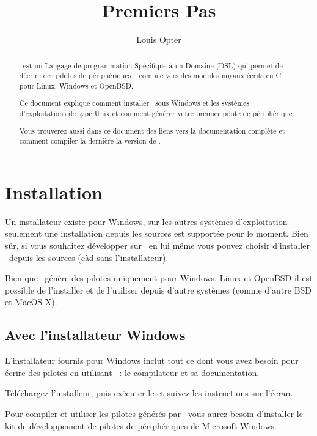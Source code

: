 \documentclass[francais]{rtxarticle}
\title{Premiers Pas}
\author{Louis Opter}
\begin{document}
\maketitle

\begin{abstract}
\rtx\ est un Langage de programmation Spécifique à un Domaine (DSL) qui permet
de décrire des pilotes de périphériques. \rtx\ compile vers des modules noyaux
écrits en C pour Linux, Windows et OpenBSD.

Ce document explique comment installer \rtx\ sous Windows et les systèmes
d'exploitations de type Unix et comment générer votre premier pilote de
périphérique.

Vous trouverez aussi dans ce document des liens vers la documentation complète
et comment compiler la dernière la version de \rtx.
\end{abstract}

\tableofcontents

\section{Installation}

Un installateur existe pour Windows, sur les autres systèmes d'exploitation
seulement une installation depuis les sources est supportée pour le moment.
Bien sûr, si vous souhaitez développer sur \rtx\ en lui même vous pouvez
choisir d'installer \rtx\ depuis les sources (càd sans l'installateur).

Bien que \rtx\ génère des pilotes uniquement pour Windows, Linux et OpenBSD il
est possible de l'installer et de l'utiliser depuis d'autre systèmes (comme
d'autre BSD et MacOS X).

\subsection{Avec l'installateur Windows}

L'installateur fournis pour Windows inclut tout ce dont vous avez besoin pour
écrire des pilotes en utilisant \rtx\ : le compilateur et sa documentation.

Téléchargez l'\href{http://rathaxes.googlecode.com/files/rathaxes-latest.exe}{installeur},
puis exécuter le et suivez les instructions sur l'écran.

Pour compiler et utiliser les pilotes générés par \rtx\ vous aurez besoin
d'installer le kit de développement de pilotes de périphériques de Microsoft
Windows.
\end{document}
